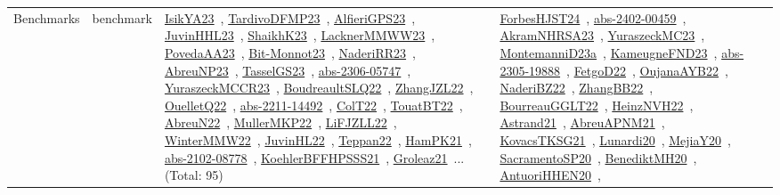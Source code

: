 {\begin{longtable}{lp{3cm}>{\raggedright\arraybackslash}p{6cm}>{\raggedright\arraybackslash}p{6cm}>{\raggedright\arraybackslash}p{8cm}}
Benchmarks & benchmark & \href{works/IsikYA23.pdf}{IsikYA23}~\cite{IsikYA23}, \href{works/TardivoDFMP23.pdf}{TardivoDFMP23}~\cite{TardivoDFMP23}, \href{works/AlfieriGPS23.pdf}{AlfieriGPS23}~\cite{AlfieriGPS23}, \href{works/JuvinHHL23.pdf}{JuvinHHL23}~\cite{JuvinHHL23}, \href{works/ShaikhK23.pdf}{ShaikhK23}~\cite{ShaikhK23}, \href{works/LacknerMMWW23.pdf}{LacknerMMWW23}~\cite{LacknerMMWW23}, \href{works/PovedaAA23.pdf}{PovedaAA23}~\cite{PovedaAA23}, \href{works/Bit-Monnot23.pdf}{Bit-Monnot23}~\cite{Bit-Monnot23}, \href{works/NaderiRR23.pdf}{NaderiRR23}~\cite{NaderiRR23}, \href{works/AbreuNP23.pdf}{AbreuNP23}~\cite{AbreuNP23}, \href{works/TasselGS23.pdf}{TasselGS23}~\cite{TasselGS23}, \href{works/abs-2306-05747.pdf}{abs-2306-05747}~\cite{abs-2306-05747}, \href{works/YuraszeckMCCR23.pdf}{YuraszeckMCCR23}~\cite{YuraszeckMCCR23}, \href{works/BoudreaultSLQ22.pdf}{BoudreaultSLQ22}~\cite{BoudreaultSLQ22}, \href{works/ZhangJZL22.pdf}{ZhangJZL22}~\cite{ZhangJZL22}, \href{works/OuelletQ22.pdf}{OuelletQ22}~\cite{OuelletQ22}, \href{works/abs-2211-14492.pdf}{abs-2211-14492}~\cite{abs-2211-14492}, \href{works/ColT22.pdf}{ColT22}~\cite{ColT22}, \href{works/TouatBT22.pdf}{TouatBT22}~\cite{TouatBT22}, \href{works/AbreuN22.pdf}{AbreuN22}~\cite{AbreuN22}, \href{works/MullerMKP22.pdf}{MullerMKP22}~\cite{MullerMKP22}, \href{works/LiFJZLL22.pdf}{LiFJZLL22}~\cite{LiFJZLL22}, \href{works/WinterMMW22.pdf}{WinterMMW22}~\cite{WinterMMW22}, \href{works/JuvinHL22.pdf}{JuvinHL22}~\cite{JuvinHL22}, \href{works/Teppan22.pdf}{Teppan22}~\cite{Teppan22}, \href{works/HamPK21.pdf}{HamPK21}~\cite{HamPK21}, \href{works/abs-2102-08778.pdf}{abs-2102-08778}~\cite{abs-2102-08778}, \href{works/KoehlerBFFHPSSS21.pdf}{KoehlerBFFHPSSS21}~\cite{KoehlerBFFHPSSS21}, \href{works/Groleaz21.pdf}{Groleaz21}~\cite{Groleaz21}... (Total: 95) & \href{works/ForbesHJST24.pdf}{ForbesHJST24}~\cite{ForbesHJST24}, \href{works/abs-2402-00459.pdf}{abs-2402-00459}~\cite{abs-2402-00459}, \href{works/AkramNHRSA23.pdf}{AkramNHRSA23}~\cite{AkramNHRSA23}, \href{works/YuraszeckMC23.pdf}{YuraszeckMC23}~\cite{YuraszeckMC23}, \href{works/MontemanniD23a.pdf}{MontemanniD23a}~\cite{MontemanniD23a}, \href{works/KameugneFND23.pdf}{KameugneFND23}~\cite{KameugneFND23}, \href{works/abs-2305-19888.pdf}{abs-2305-19888}~\cite{abs-2305-19888}, \href{works/FetgoD22.pdf}{FetgoD22}~\cite{FetgoD22}, \href{works/OujanaAYB22.pdf}{OujanaAYB22}~\cite{OujanaAYB22}, \href{works/NaderiBZ22.pdf}{NaderiBZ22}~\cite{NaderiBZ22}, \href{works/ZhangBB22.pdf}{ZhangBB22}~\cite{ZhangBB22}, \href{works/BourreauGGLT22.pdf}{BourreauGGLT22}~\cite{BourreauGGLT22}, \href{works/HeinzNVH22.pdf}{HeinzNVH22}~\cite{HeinzNVH22}, \href{works/Astrand21.pdf}{Astrand21}~\cite{Astrand21}, \href{works/AbreuAPNM21.pdf}{AbreuAPNM21}~\cite{AbreuAPNM21}, \href{works/KovacsTKSG21.pdf}{KovacsTKSG21}~\cite{KovacsTKSG21}, \href{works/Lunardi20.pdf}{Lunardi20}~\cite{Lunardi20}, \href{works/MejiaY20.pdf}{MejiaY20}~\cite{MejiaY20}, \href{works/SacramentoSP20.pdf}{SacramentoSP20}~\cite{SacramentoSP20}, \href{works/BenediktMH20.pdf}{BenediktMH20}~\cite{BenediktMH20}, \href{works/AntuoriHHEN20.pdf}{AntuoriHHEN20}~\cite{AntuoriHHEN20}, 
\end{longtable}}
